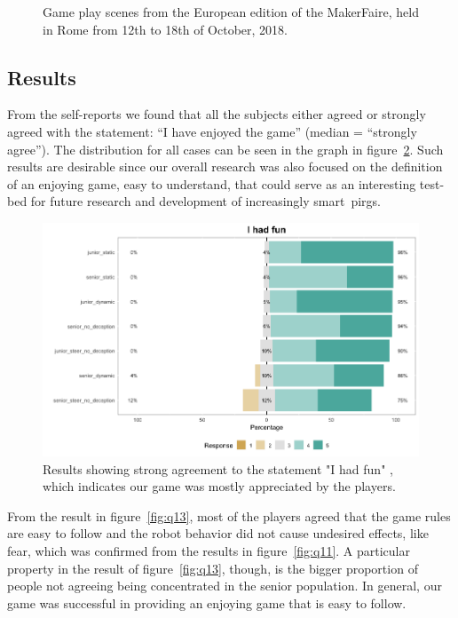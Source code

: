 \begin{figure}[h]
\begin{subfigure}[h]{0.49\columnwidth}
        \caption{}
    \end{subfigure}
    \caption{Game play scenes from the European edition of the MakerFaire, held in Rome from 12th to 18th of October, 2018.}
    \label{fig:maker_faire}
\end{figure}

\subsection{Results}
From the self-reports we found that all the subjects either agreed or strongly agreed with the statement: ``I have enjoyed the game'' (median = ``strongly agree''). The distribution for all cases can be seen in the graph in figure~\ref{fig:q6}. Such results are desirable since our overall research was also focused on the definition of an enjoying game, easy to understand, that could serve as an interesting test-bed for future research and development of increasingly smart~\gls{pirg}s.

\begin{figure}[b]
    \centering
    \includegraphics[draft=false, width=\linewidth]{images/06-deception/Q6}
    \caption{Results showing strong agreement to the statement "I had fun" , which indicates our game was mostly appreciated by the players.}
    \label{fig:q6}
\end{figure}

From the result in figure~\ref{fig:q13}, most of the players agreed that the game rules are easy to follow and the robot behavior did not cause undesired effects, like fear, which was confirmed from the results in figure~\ref{fig:q11}. A particular property in the result of figure~\ref{fig:q13}, though, is the bigger proportion of people not agreeing being concentrated in the senior population. In general, our game was successful in providing an enjoying game that is easy to follow.

